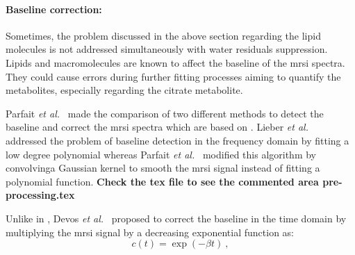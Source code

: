 \paragraph{Baseline correction:} Sometimes, the problem discussed in the above section regarding the lipid molecules is not addressed simultaneously with water residuals suppression.
Lipids and macromolecules are known to affect the baseline of the \ac{mrsi} spectra.
They could cause errors during further fitting processes aiming to quantify the metabolites, especially regarding the citrate metabolite.
	
Parfait \textit{et al.}~\cite{Parfait2012} made the comparison of two different methods to detect the baseline and correct the \ac{mrsi} spectra which are based on \cite{Lieber2003,Devos2004}. 
Lieber \textit{et al.}~\cite{Lieber2003} addressed the problem of baseline detection in the frequency domain by fitting a low degree  polynomial whereas Parfait \textit{et al.}~\cite{Parfait2012} modified this algorithm by convolvinga Gaussian kernel to smooth the \ac{mrsi} signal instead of fitting a polynomial function.
{\color{red} \textbf{Check the tex file to see the commented area pre-processing.tex}}



Unlike in \cite{Lieber2003}, Devos \textit{et al.}~\cite{Devos2004} proposed to correct the baseline in the time domain by multiplying the \ac{mrsi} signal by a decreasing exponential function as:
\begin{equation}
	c(t) = \exp (- \beta t) \ ,
	\label{eq:devos}
\end{equation}

